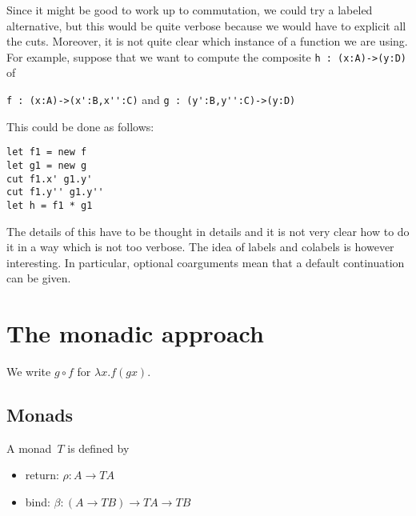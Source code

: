 \documentclass[a4paper,titlepage]{article}
\begin{document}
Since it might be good to work up to commutation, we could try a labeled
alternative, but this would be quite verbose because we would have to explicit
all the cuts. Moreover, it is not quite clear which instance of a function we
are using. For example, suppose that we want to compute the composite
\verb|h : (x:A)->(y:D)| of
\begin{center}
  \verb|f : (x:A)->(x':B,x'':C)|
  \qquad and\qquad
  \verb|g : (y':B,y'':C)->(y:D)|
\end{center}
This could be done as follows:
\begin{verbatim}
let f1 = new f
let g1 = new g
cut f1.x' g1.y'
cut f1.y'' g1.y''
let h = f1 * g1
\end{verbatim}
The details of this have to be thought in details and it is not very clear how
to do it in a way which is not too verbose. The idea of labels and colabels is
however interesting. In particular, optional coarguments mean that a default
continuation can be given.

\newpage
\section{The monadic approach}
We write $g\circ f$ for $\lambda x.f(gx)$.

\subsection{Monads}
A monad~$T$ is defined by
\begin{itemize}
\item return: $\rho:A\to TA$
\item bind: $\beta:(A\to TB)\to TA\to TB$
\end{itemize}
\end{document}
